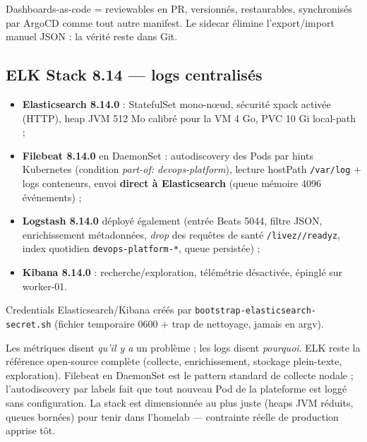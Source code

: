 \documentclass[11pt,a4paper]{article}
\begin{document}
\begin{whybox}
Dashboards-as-code = reviewables en PR, versionnés, restaurables, synchronisés par ArgoCD comme tout autre manifest. Le sidecar élimine l'export/import manuel JSON : la vérité reste dans Git.
\end{whybox}

\subsection{ELK Stack 8.14 --- logs centralisés}
\begin{itemize}[itemsep=2pt]
  \item \textbf{Elasticsearch 8.14.0} : StatefulSet mono-nœud, sécurité xpack activée (HTTP), heap JVM 512 Mo calibré pour la VM 4 Go, PVC 10 Gi local-path ;
  \item \textbf{Filebeat 8.14.0} en DaemonSet : autodiscovery des Pods par hints Kubernetes (condition \emph{part-of: devops-platform}), lecture hostPath \texttt{/var/log} + logs conteneurs, envoi \textbf{direct à Elasticsearch} (queue mémoire 4096 événements) ;
  \item \textbf{Logstash 8.14.0} déployé également (entrée Beats 5044, filtre JSON, enrichissement métadonnées, \emph{drop} des requêtes de santé \texttt{/livez//readyz}, index quotidien \texttt{devops-platform-*}, queue persistée) ;
  \item \textbf{Kibana 8.14.0} : recherche/exploration, télémétrie désactivée, épinglé sur worker-01.
\end{itemize}

Credentials Elasticsearch/Kibana créés par \texttt{bootstrap-elasticsearch-secret.sh} (fichier temporaire 0600 + trap de nettoyage, jamais en argv).

\begin{whybox}
Les métriques disent \emph{qu'il y a} un problème ; les logs disent \emph{pourquoi}. ELK reste la référence open-source complète (collecte, enrichissement, stockage plein-texte, exploration). Filebeat en DaemonSet est le pattern standard de collecte nodale ; l'autodiscovery par labels fait que tout nouveau Pod de la plateforme est loggé sans configuration. La stack est dimensionnée au plus juste (heaps JVM réduits, queues bornées) pour tenir dans l'homelab --- contrainte réelle de production apprise tôt.
\end{whybox}
\end{document}
